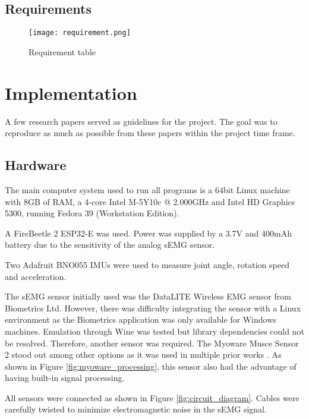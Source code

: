 \subsection{Requirements}
\begin{figure}[htbp]
  \centering
  \texttt{[image: requirement.png]}
  \caption{Requirement table}
  \label{fig:requirements_table}
\end{figure}
\FloatBarrier

\section{Implementation}
A few research papers \cite{lu_development_2019,wu_neural-network-enhanced_2019,wu_adaptive_2023} 
served as guidelines for the project. The goal was to reproduce as much as possible 
from these papers within the project time frame.  

\subsection{Hardware}
The main computer system used to run all programs is a 64bit Linux machine with 
8GB of RAM, a 4-core Intel M-5Y10c @ 2.000GHz and Intel HD Graphics 5300, running 
Fedora 39 (Workstation Edition).  

A FireBeetle 2 ESP32-E was used. Power was supplied by a 3.7V and 400mAh battery 
due to the sensitivity of the analog sEMG sensor.

Two Adafruit BNO055 IMUs were used to measure joint angle, rotation speed 
and acceleration.  

The sEMG sensor initially used was the DataLITE Wireless EMG sensor from Biometrics 
Ltd. However, there was difficulty integrating the sensor with a Linux environment 
as the Biometrics application was only available for Windows machines. Emulation 
through Wine was tested but library dependencies could not be resolved. Therefore, 
another sensor was required. The Myoware Musce Sensor 2 stood out among other options 
as it was used in multiple prior works \cite{lu_development_2019,wu_neural-network-enhanced_2019,
wu_adaptive_2023,russo_algorithm_2018}. As shown in Figure \ref{fig:myoware_processing}, 
this sensor also had the advantage of having built-in signal processing. 

All sensors were connected as shown in Figure \ref{fig:circuit_diagram}. Cables 
were carefully twisted to minimize electromagnetic noise in the sEMG signal.  

